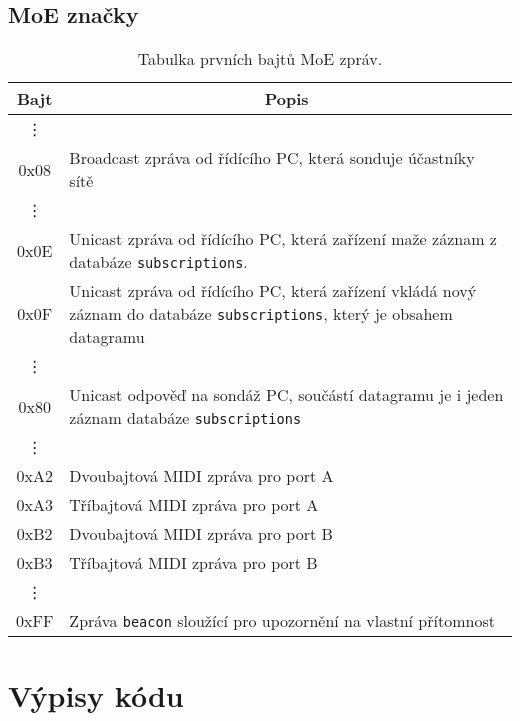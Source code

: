 \section{\acs{MoE} značky}\label{chpt:MoEZnacky}
\begin{table}[h]
	\centering
	\begin{tabular}{|  >{\ttfamily} c | p{} |}
		\hline
		\textnormal{Bajt} & \multicolumn{1}{|c|}{Popis} \\
		\hline \hline
		\vdots & \\
		
		0x08 & Broadcast zpráva od řídícího PC, která sonduje účastníky sítě \\
		
		\vdots & \\

		0x0E & Unicast zpráva od řídícího  PC, která zařízení maže záznam z databáze \texttt{subscriptions}. \\
		
		0x0F & Unicast zpráva od řídícího PC, která zařízení vkládá nový záznam do databáze \texttt{subscriptions}, který je obsahem datagramu \\
		
		\vdots & \\
		
		0x80 & Unicast odpověď na sondáž PC, součástí datagramu je i jeden záznam databáze \texttt{subscriptions} \\

		\vdots & \\

		0xA2 & Dvoubajtová \acs{MIDI} zpráva pro port A \\
		0xA3 & Tříbajtová \acs{MIDI} zpráva pro port A \\
		0xB2 & Dvoubajtová \acs{MIDI} zpráva pro port B \\
		0xB3 & Tříbajtová \acs{MIDI} zpráva pro port B \\
		
		\vdots & \\
		
		0xFF & Zpráva \texttt{beacon} sloužící pro upozornění na vlastní přítomnost \\
		\hline
	\end{tabular}
	\caption{Tabulka prvních bajtů \acs{MoE} zpráv.}
\end{table}


\chapter{Výpisy kódu}
